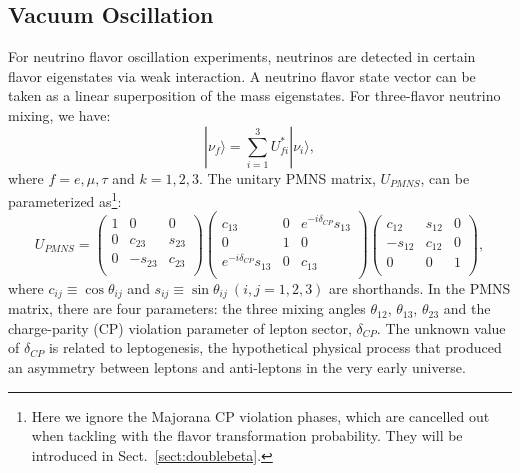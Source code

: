\subsection{Vacuum Oscillation}\label{sect:VacuumOsci}
For neutrino flavor oscillation experiments, neutrinos are detected in certain flavor eigenstates via weak interaction. A neutrino flavor state vector can be taken as a linear superposition of the mass eigenstates. For three-flavor neutrino mixing, we have\cite{pdg2020}:
\begin{equation}\label{eq:mixingmatrix}
|\nu_f\rangle = \sum_{i=1}^3U^*_{fi}|\nu_i\rangle, 
\end{equation}
where $f=e,\mu,\tau$ and $k=1,2,3$. The unitary PMNS matrix, $U_{PMNS}$, can be parameterized as\footnote{Here we ignore the Majorana CP violation phases, which are cancelled out when tackling with the flavor transformation probability. They will be introduced in Sect.~\ref{sect:doublebeta}.}: 
\begin{equation}\label{eq:uPMNS}
U_{PMNS} =
\begin{pmatrix}
1 &0 &0\\
0 &c_{23} &s_{23}\\
0 &-s_{23} &c_{23}\\ 
\end{pmatrix}
\begin{pmatrix}
c_{13} &0 &e^{-i\delta_{CP}}s_{13}\\
0 &1 &0\\
e^{-i\delta_{CP}}s_{13} &0 &c_{13}\\ 
\end{pmatrix}
\begin{pmatrix}
c_{12} &s_{12} &0\\
-s_{12} &c_{12} &0\\
0 &0 &1\\ 
\end{pmatrix},
\end{equation}
where $c_{ij}\equiv \cos\theta_{ij}$ and $s_{ij}\equiv \sin\theta_{ij}~(i,j = 1,2,3)$ are shorthands.
In the PMNS matrix, there are four parameters: the three mixing angles $\theta_{12}$, $\theta_{13}$, $\theta_{23}$ and the charge-parity (CP) violation parameter of lepton sector, $\delta_{CP}$. The unknown value of $\delta_{CP}$ is related to leptogenesis, the hypothetical physical process that produced an asymmetry between leptons and anti-leptons in the very early universe\cite{wiki_cp}. 

